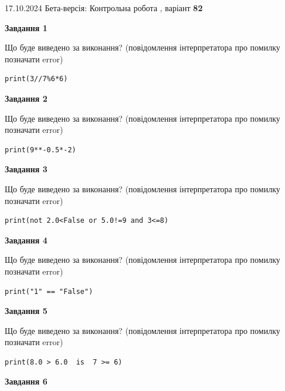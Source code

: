 \documentclass[12pt, ukrainian]{article}
\begin{document}
{\Large{17.10.2024 Бета-версія: Контрольна робота , варіант  \No \textbf { 82 }\par}}
{
\begin {large}
{\begin {center}\textbf{Завдання 1}\end {center}}

Що буде виведено за виконання? (повідомлення інтерпретатора про помилку позначати error)\par
\begin{verbatim}
print(3//7%6*6)
\end{verbatim}

{\begin {center}\textbf{Завдання 2}\end {center}}

Що буде виведено за виконання? (повідомлення інтерпретатора про помилку позначати error)\par
\begin{verbatim}
print(9**-0.5*-2)
\end{verbatim}

{\begin {center}\textbf{Завдання 3}\end {center}}

Що буде виведено за виконання? (повідомлення інтерпретатора про помилку позначати error)\par
\begin{verbatim}
print(not 2.0<False or 5.0!=9 and 3<=8)
\end{verbatim}

{\begin {center}\textbf{Завдання 4}\end {center}}

Що буде виведено за виконання? (повідомлення інтерпретатора про помилку позначати error)\par
\begin{verbatim}
print("1" == "False")
\end{verbatim}

{\begin {center}\textbf{Завдання 5}\end {center}}

Що буде виведено за виконання? (повідомлення інтерпретатора про помилку позначати error)\par
\begin{verbatim}
print(8.0 > 6.0  is  7 >= 6)
\end{verbatim}

{\begin {center}\textbf{Завдання 6}\end {center}}


\end{large}}
\end{document}
